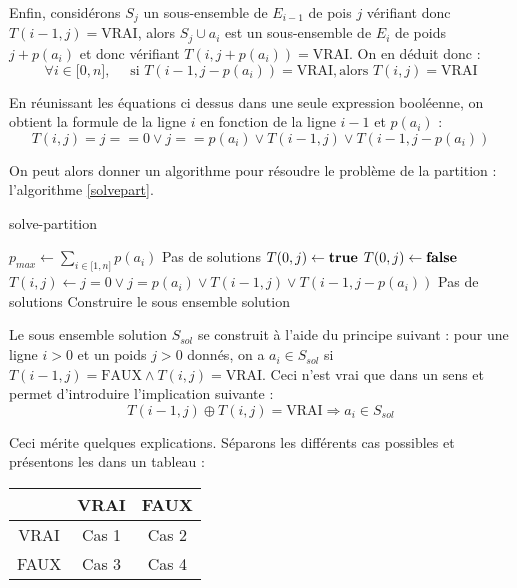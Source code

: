 Enfin, considérons $S_j$ un sous-ensemble de $E_{i-1}$ de pois $j$ vérifiant donc $T(i-1, j) =
\mbox{VRAI}$, alors $S_j \cup a_i$ est un sous-ensemble de $E_i$ de poids $j+p(a_i)$ et donc
vérifiant $T(i,j+p(a_i)) = \mbox{VRAI}$. On en déduit donc :
\begin{equation}
	\forall i \in \mathbb{[}0, n \mathbb{]}, \quad \mbox{ si } T(i-1, j-p(a_i)) = \mbox{VRAI}, \mbox{
	alors } T(i,j) = \mbox{VRAI}
\end{equation}

En réunissant les équations ci dessus dans une seule expression booléenne, on obtient la formule de
la ligne $i$ en fonction de la ligne $i-1$ et $p(a_i)$ :
\begin{equation}
	T(i,j) = j == 0 \vee j == p(a_i) \vee T(i-1, j) \vee T(i-1, j-p(a_i))
\end{equation}

On peut alors donner un algorithme pour résoudre le problème de la partition : l'algorithme
\ref{solvepart}.

\begin{algorithm}
	\caption{solve-partition}
	\label{solvepart}
	\begin{algorithmic}[1]
		\STATE $p_{max} \leftarrow \sum_{i \in \mathbb{[}1, n \mathbb{]}} p(a_i)$
			\STATE Pas de solutions
		\ELSE
					\STATE $T(0, j) \leftarrow \textbf{true}{}$
				\ELSE
					\STATE $T(0, j) \leftarrow \textbf{false}{}$
				\ENDIF
			\ENDFOR
					\STATE $T(i, j) \leftarrow j = 0 \vee j = p(a_i) \vee T(i-1, j) \vee T(i-1, j-p(a_i))$
				\ENDFOR
			\ENDFOR
				\STATE Pas de solutions
			\ELSE
				\STATE Construire le sous ensemble solution
			\ENDIF
		\ENDIF
	\end{algorithmic}
\end{algorithm}

Le sous ensemble solution $S_{sol}$ se construit à l'aide du principe suivant : pour une ligne $i>0$ et
un poids $j>0$ donnés, on a $a_i \in S_{sol}$ si $T(i-1, j) = \mbox{FAUX} \wedge T(i,j) =
\mbox{VRAI}$. Ceci n'est vrai que dans un sens et permet d'introduire l'implication suivante :
\begin{equation}
	\label{ineq}
	T(i-1, j) \oplus T(i, j) = \mbox{VRAI} \Rightarrow a_i \in S_{sol} 
\end{equation}

Ceci mérite quelques explications. Séparons les différents cas possibles et présentons les dans un
tableau : \\
\begin{center}
\begin{tabular}{|c|c|c|} \hline
	\backslashbox{$T(i-1, j)$}{$T(i,j)$} & VRAI & FAUX \\	\hline
	VRAI & Cas 1 & Cas 2 \\ \hline
	FAUX & Cas 3 & Cas 4 \\ \hline
\end{tabular}
\end{center}

